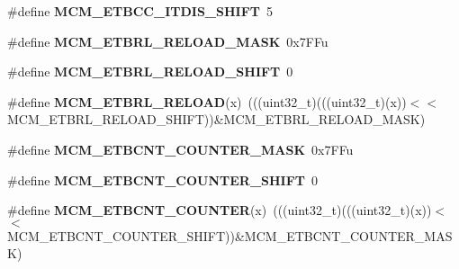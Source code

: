 \begin{DoxyCompactItemize}
\item 
\#define {\bfseries M\+C\+M\+\_\+\+E\+T\+B\+C\+C\+\_\+\+I\+T\+D\+I\+S\+\_\+\+S\+H\+I\+FT}~5\hypertarget{group__MCM__Register__Masks_ga92bf57df9f719917686203be01c3d141}{}\label{group__MCM__Register__Masks_ga92bf57df9f719917686203be01c3d141}

\item 
\#define {\bfseries M\+C\+M\+\_\+\+E\+T\+B\+R\+L\+\_\+\+R\+E\+L\+O\+A\+D\+\_\+\+M\+A\+SK}~0x7\+F\+Fu\hypertarget{group__MCM__Register__Masks_gab63bbd758727921d1744034311a25c81}{}\label{group__MCM__Register__Masks_gab63bbd758727921d1744034311a25c81}

\item 
\#define {\bfseries M\+C\+M\+\_\+\+E\+T\+B\+R\+L\+\_\+\+R\+E\+L\+O\+A\+D\+\_\+\+S\+H\+I\+FT}~0\hypertarget{group__MCM__Register__Masks_ga04c87446d72a2644f3ee4d493f5febba}{}\label{group__MCM__Register__Masks_ga04c87446d72a2644f3ee4d493f5febba}

\item 
\#define {\bfseries M\+C\+M\+\_\+\+E\+T\+B\+R\+L\+\_\+\+R\+E\+L\+O\+AD}(x)~(((uint32\+\_\+t)(((uint32\+\_\+t)(x))$<$$<$M\+C\+M\+\_\+\+E\+T\+B\+R\+L\+\_\+\+R\+E\+L\+O\+A\+D\+\_\+\+S\+H\+I\+FT))\&M\+C\+M\+\_\+\+E\+T\+B\+R\+L\+\_\+\+R\+E\+L\+O\+A\+D\+\_\+\+M\+A\+SK)\hypertarget{group__MCM__Register__Masks_ga3aa435178b25a3eb59fa4c76c4276fa4}{}\label{group__MCM__Register__Masks_ga3aa435178b25a3eb59fa4c76c4276fa4}

\item 
\#define {\bfseries M\+C\+M\+\_\+\+E\+T\+B\+C\+N\+T\+\_\+\+C\+O\+U\+N\+T\+E\+R\+\_\+\+M\+A\+SK}~0x7\+F\+Fu\hypertarget{group__MCM__Register__Masks_ga0ad096c8133f83aad1812ed0263a47a7}{}\label{group__MCM__Register__Masks_ga0ad096c8133f83aad1812ed0263a47a7}

\item 
\#define {\bfseries M\+C\+M\+\_\+\+E\+T\+B\+C\+N\+T\+\_\+\+C\+O\+U\+N\+T\+E\+R\+\_\+\+S\+H\+I\+FT}~0\hypertarget{group__MCM__Register__Masks_ga6f3bfee5c1a266db914bfcce1b33e40f}{}\label{group__MCM__Register__Masks_ga6f3bfee5c1a266db914bfcce1b33e40f}

\item 
\#define {\bfseries M\+C\+M\+\_\+\+E\+T\+B\+C\+N\+T\+\_\+\+C\+O\+U\+N\+T\+ER}(x)~(((uint32\+\_\+t)(((uint32\+\_\+t)(x))$<$$<$M\+C\+M\+\_\+\+E\+T\+B\+C\+N\+T\+\_\+\+C\+O\+U\+N\+T\+E\+R\+\_\+\+S\+H\+I\+FT))\&M\+C\+M\+\_\+\+E\+T\+B\+C\+N\+T\+\_\+\+C\+O\+U\+N\+T\+E\+R\+\_\+\+M\+A\+SK)\hypertarget{group__MCM__Register__Masks_ga14675877220745e714191f35ea848ee5}{}\label{group__MCM__Register__Masks_ga14675877220745e714191f35ea848ee5}


\end{DoxyCompactItemize}
